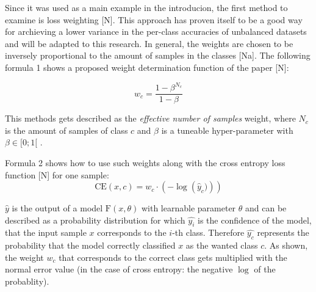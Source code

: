 \documentclass[journal]{IEEEtran}
\begin{document}
Since it was used as a main example in the introducion, the first method to examine is loss weighting [N]. 
This approach has proven itself to be a good way for archieving a lower variance in the per-class accuracies of unbalanced datasets and will be adapted to this research. 
In general, the weights are chosen to be inversely proportional to the amount of samples in the classes [Na].
The following formula 1 shows a proposed weight determination function of the paper [N]:

\[ w_c = \frac{1-\beta^{N_c}}{1-\beta} \]

This methods gets described as the \emph{effective number of samples} weight, where $N_c$ is the amount of samples of class $c$ and $\beta$ is a tuneable hyper-parameter with $\beta \in [0;1[$ .

Formula 2 shows how to use such weights along with the cross entropy loss function [N] for one sample:
\[ \text{CE}(x, c) = w_{c} \cdot \left(-\log\left(\hat{y}_c)\right) \right) \]



$\hat{y}$ is the output of a model $\text{F}(x, \theta)$ with learnable parameter $\theta$ and can be described as a probability distribution for which $\hat{y_i}$ is the confidence of the model, that the input sample $x$ corresponds to the $i$-th class.
Therefore $\hat{y_c}$ represents the probability that the model correctly classified $x$ as the wanted class $c$. 
As shown, the weight $w_c$ that corresponds to the correct class gets multiplied with the normal error value (in the case of cross entropy: the negative $\log$ of the probablity).

\end{document}
